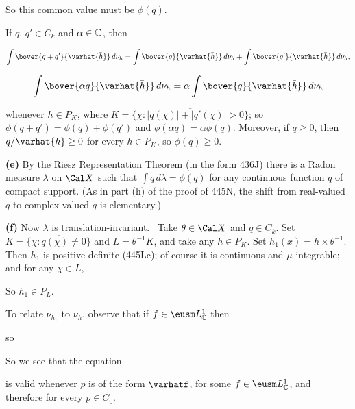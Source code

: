 {\noindent So this common value must be $\phi(q)$.\ \Qed

If $q$, $q'\in C_k$ and $\alpha\in\Bbb C$, then

$$\int\bover{q+q'}{\varhat{\bar h}}\,d\nu_h
=\int\bover{q}{\varhat{\bar h}}\,d\nu_h
  +\int\bover{q'}{\varhat{\bar h}}\,d\nu_h,$$

$$\int\bover{\alpha q}{\varhat{\bar h}}\,d\nu_h
=\alpha\int\bover{q}{\varhat{\bar h}}\,d\nu_h$$

\noindent whenever $h\in P_K$, where
$K=\overline{\{\chi:|q(\chi)|+|q'(\chi)|>0\}}$;  so
$\phi(q+q')=\phi(q)+\phi(q')$ and $\phi(\alpha q)=\alpha\phi(q)$.
Moreover, if $q\ge 0$, then
$q/\varhat{\bar h}\ge 0$ for every $h\in P_K$, so $\phi(q)\ge 0$.

\medskip

{\bf (e)} By the Riesz Representation Theorem (in the form 436J) there
is a Radon measure $\lambda$ on $\Cal X$ such that
$\int q\,d\lambda=\phi(q)$ for any continuous function $q$ of compact
support.   (As in part (h) of the proof of 445N, the shift from
real-valued $q$ to complex-valued $q$ is elementary.)

\medskip

{\bf (f)} Now $\lambda$ is translation-invariant.   \Prf\ Take
$\theta\in\Cal X$ and $q\in C_k$.   Set
$K=\overline{\{\chi:q(\chi)\ne 0\}}$ and $L=\theta^{-1}K$, and
take any $h\in P_K$.  Set $h_1(x)=h\times\theta^{-1}$.   Then
$h_1$ is positive definite (445Lc);  of course it is continuous and
$\mu$-integrable;  and for any $\chi\in L$,


\noindent So $h_1\in P_L$.

To relate $\nu_{h_1}$ to $\nu_h$, observe that if
$f\in\eusm L_{\Bbb C}^1$ then


\noindent so


\noindent So we see that the equation


\noindent is valid whenever $p$ is of the form $\varhatf$, for some
$f\in\eusm L_{\Bbb C}^1$, and therefore for every $p\in C_0$.

}

